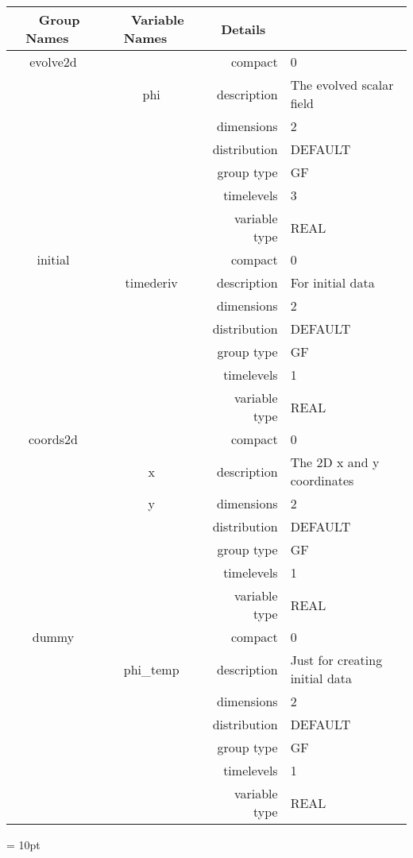 \vspace{5mm}

\begin{tabular*}{150mm}{|c|c@{\extracolsep{\fill}}|rl|} \hline 
~ {\bf Group Names} ~ & ~ {\bf Variable Names} ~  &{\bf Details} ~ & ~\\ 
\hline 
evolve2d &  & compact & 0 \\ 
 & phi & description & The evolved scalar field \\ 
 &  & dimensions & 2 \\ 
 &  & distribution & DEFAULT \\ 
 &  & group type & GF \\ 
 &  & timelevels & 3 \\ 
 &  & variable type & REAL \\ 
\hline 
initial &  & compact & 0 \\ 
 & timederiv & description & For initial data \\ 
 &  & dimensions & 2 \\ 
 &  & distribution & DEFAULT \\ 
 &  & group type & GF \\ 
 &  & timelevels & 1 \\ 
 &  & variable type & REAL \\ 
\hline 
coords2d &  & compact & 0 \\ 
 & x & description & The 2D x and y coordinates \\ 
 & y & dimensions & 2 \\ 
 &  & distribution & DEFAULT \\ 
 &  & group type & GF \\ 
 &  & timelevels & 1 \\ 
 &  & variable type & REAL \\ 
\hline 
dummy &  & compact & 0 \\ 
 & phi\_temp & description & Just for creating initial data \\ 
 &  & dimensions & 2 \\ 
 &  & distribution & DEFAULT \\ 
 &  & group type & GF \\ 
 &  & timelevels & 1 \\ 
 &  & variable type & REAL \\ 
\hline 
\end{tabular*} 



\vspace{5mm}\parskip = 10pt 

